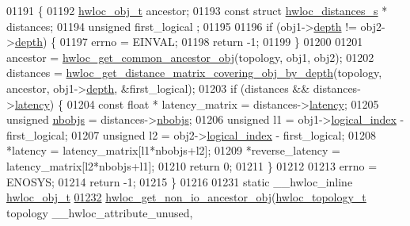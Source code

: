 \begin{DoxyCode}
{{01191 \{
01192   \hyperlink{a00016}{hwloc_obj_t} ancestor;
01193   \textcolor{keyword}{const} \textcolor{keyword}{struct }\hyperlink{a00014}{hwloc_distances_s} * distances;
01194   \textcolor{keywordtype}{unsigned} first\_logical ;
01195 
01196   \textcolor{keywordflow}{if} (obj1->\hyperlink{a00016_a9d82690370275d42d652eccdea5d3ee5}{depth} != obj2->\hyperlink{a00016_a9d82690370275d42d652eccdea5d3ee5}{depth}) \{
01197     errno = EINVAL;
01198     \textcolor{keywordflow}{return} -1;
01199   \}
01200 
01201   ancestor = \hyperlink{a00053_ga52a334f17c6b5b409d5cc6bb4ab8a2ab}{hwloc_get_common_ancestor_obj}(topology, obj1, obj2);
01202   distances = \hyperlink{a00063_ga186ac2711b98a12cf46d58cd005fbb51}{hwloc_get_distance_matrix_covering_obj_by_depth}(topology, ancestor,
       obj1->\hyperlink{a00016_a9d82690370275d42d652eccdea5d3ee5}{depth}, &first\_logical);
01203   \textcolor{keywordflow}{if} (distances && distances->\hyperlink{a00014_a0f70f48d1bfb18e5e2008825da2967c9}{latency}) \{
01204     \textcolor{keyword}{const} \textcolor{keywordtype}{float} * latency\_matrix = distances->\hyperlink{a00014_a0f70f48d1bfb18e5e2008825da2967c9}{latency};
01205     \textcolor{keywordtype}{unsigned} \hyperlink{a00014_a4ca2af858cebbce7324ec49903d09474}{nbobjs} = distances->\hyperlink{a00014_a4ca2af858cebbce7324ec49903d09474}{nbobjs};
01206     \textcolor{keywordtype}{unsigned} l1 = obj1->\hyperlink{a00016_a0d07fb7b8935e137c94d75a3eb492ae9}{logical_index} - first\_logical;
01207     \textcolor{keywordtype}{unsigned} l2 = obj2->\hyperlink{a00016_a0d07fb7b8935e137c94d75a3eb492ae9}{logical_index} - first\_logical;
01208     *latency = latency\_matrix[l1*nbobjs+l2];
01209     *reverse\_latency = latency\_matrix[l2*nbobjs+l1];
01210     \textcolor{keywordflow}{return} 0;
01211   \}
01212 
01213   errno = ENOSYS;
01214   \textcolor{keywordflow}{return} -1;
01215 \}
01216 
01231 \textcolor{keyword}{static} \_\_hwloc\_inline \hyperlink{a00016}{hwloc_obj_t}
\hypertarget{a00031_source_l01232}{}\hyperlink{a00064_ga3603275746a8792e54415d79763aa9e9}{01232} \hyperlink{a00064_ga3603275746a8792e54415d79763aa9e9}{hwloc_get_non_io_ancestor_obj}(\hyperlink{a00039_ga9d1e76ee15a7dee158b786c30b6a6e38}{hwloc_topology_t} topology \_\_hwloc\_attribute\_unused,
      
}}
\end{DoxyCode}

